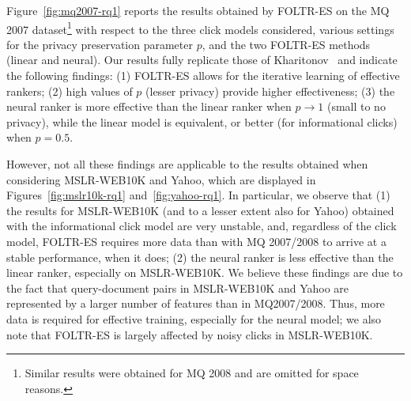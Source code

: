 Figure~\ref{fig:mq2007-rq1} reports the results obtained by FOLTR-ES on the MQ 2007 dataset\footnote{Similar results were obtained for MQ 2008 and are omitted for space reasons.} with respect to the three click models considered, various settings for the privacy preservation parameter $p$, and the two FOLTR-ES methods (linear and neural). Our results fully replicate those of Kharitonov~\cite{kharitonov2019federated} and indicate the following findings: (1) FOLTR-ES allows for the iterative learning of effective rankers; (2) high values of $p$ (lesser privacy) provide higher effectiveness; 
(3) the neural ranker is more effective than the linear ranker when $p \rightarrow 1$ (small to no privacy), while the linear model is equivalent, or better (for informational clicks) when $p=0.5$. 

However, not all these findings are applicable to the results obtained when considering MSLR-WEB10K and Yahoo, which are displayed in Figures~\ref{fig:mslr10k-rq1} and~\ref{fig:yahoo-rq1}. In particular, we observe that (1) the results for MSLR-WEB10K (and to a lesser extent also for Yahoo) obtained with the informational click model are very unstable, and, regardless of the click model, FOLTR-ES requires more data than with MQ 2007/2008 to arrive at a stable performance, when it does; (2) the neural ranker is less effective than the linear ranker, especially on MSLR-WEB10K. We believe these findings are due to the fact that query-document pairs in MSLR-WEB10K and Yahoo are represented by a larger number of features than in MQ2007/2008. Thus, more data is required for effective training, especially for the neural model; we also note that FOLTR-ES is largely affected by noisy clicks in MSLR-WEB10K. 






